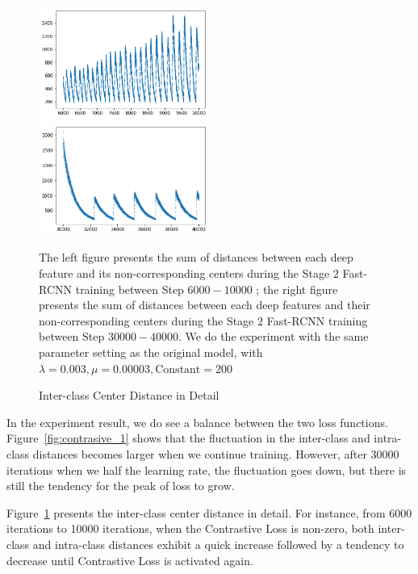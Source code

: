 \documentclass[a4paper]{article}
\begin{document}
\begin{figure}[H]
\centering
\begin{minipage}{\textwidth} %
\includegraphics[width=0.5\textwidth]{head.png}
\includegraphics[width=0.5\textwidth]{tail.png}\\
\footnotesize{The left figure presents the sum of distances between each deep feature and its non-corresponding centers during the Stage $2$ Fast-RCNN training between Step $6000-10000$ ; the right figure presents the sum of distances between each deep features and their non-corresponding centers during the Stage $2$ Fast-RCNN training between Step $30000-40000$. We do the experiment with the same parameter setting as the original model, with $\lambda = 0.003, \mu = 0.00003, \text{Constant} = 200$ \par}
\end{minipage}
\caption{Inter-class Center Distance in Detail}
\label{fig:contrasive_2}
\end{figure}

In the experiment result, we do see a balance between the two loss functions. Figure~\ref{fig:contrasive_1} shows that the fluctuation in the inter-class and intra-class distances becomes larger when we continue training. However, after 30000 iterations when we half the learning rate, the fluctuation goes down, but there is still the tendency for the peak of loss to grow. 

Figure~\ref{fig:contrasive_2} presents the inter-class center distance in detail. For instance, from 6000 iterations to 10000 iterations, when the Contrastive Loss is non-zero, both inter-class and intra-class distances exhibit a quick increase followed by a tendency to decrease until Contrastive Loss is activated again.
\end{document}
